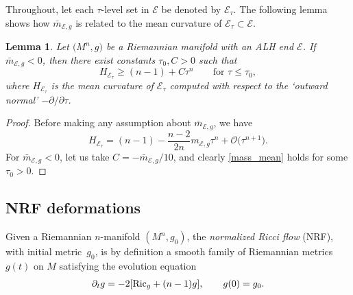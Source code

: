 \documentclass[10pt,a4paper]{amsart}
\numberwithin{equation}{section}
\newtheorem{Lemma}[Theorem]{Lemma}
\def\Ecal{\mathcal{E}}
\def\Ocal{\mathcal{O}}
\def\Ric{{\rm Ric}}
\begin{document}
Throughout, let each $\tau$-level set in $\Ecal$ be denoted by $\Ecal_\tau$.
The following lemma shows how $\bar m_{\Ecal,g}$ is related to the mean curvature of $\Ecal_\tau\subset \Ecal$.

\begin{Lemma}\label{meancurvslice}
Let $\big(M^n,g\big)$ be a Riemannian manifold with an ALH end $\Ecal$. If $\bar m_{\Ecal,g}<0$, then there exist constants $\tau_0, C>0$ such that
\begin{equation}\label{mass_mean}
H_{\Ecal_\tau}\geq (n-1)+C\tau^n \qquad \mbox{for } \tau\le\tau_0,
\end{equation}
where $H_{\Ecal_\tau}$ is the mean curvature of $\Ecal_\tau$ computed
with respect to the `outward normal' $-\partial/\partial\tau$.
\end{Lemma}

\begin{proof}
Before making any assumption about $\bar m_{\Ecal,g}$, we have
\begin{equation}\label{meanCurvAsymp}
H_{\Ecal_\tau}=(n-1)-\frac{n-2}{2n}m_{\Ecal,g}\tau^n +\Ocal\big(\tau^{n+1}\big).
\end{equation}
For $\bar m_{\Ecal,g} < 0$, let us take
 $C = -\bar m_{\Ecal,g}/10$, and clearly \eqref{mass_mean} holds for some $\tau_0>0$.
\end{proof}


\subsection{NRF deformations}
Given a Riemannian $n$-manifold $(M^n, g_0)$, the \emph{normalized Ricci flow} (NRF), with initial metric~$g_0$, is by definition a smooth family of
Riemannian metrics $g(t)$ on $M$
satisfying the evolution equation
\begin{gather}\label{NRF}
\partial_t g =-2[\Ric_g+(n-1) g],\qquad
g(0) = g_0.
\end{gather}
\end{document}
